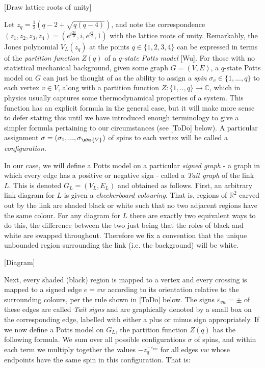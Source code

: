 [Draw lattice roots of unity]\newline

Let $z_q = \frac{1}{2}\left(q - 2 + \sqrt{q(q - 4)}\right)$, and note the correspondence $(z_1, z_2, z_3, z_4) = (e^{i\frac{2\pi}{3}}, i, e^{i\frac{\pi}{3}}, 1)$ with the lattice roots of unity. Remarkably, the Jones polynomial $V_L(z_q)$ at the points $q \in \{1, 2, 3, 4\}$ can be expressed in terms of the \textit{partition function} $Z(q)$ of a \textit{$q$-state Potts model} [Wu]. For those with no statistical mechanical background, given some graph $G = (V, E)$, a $q$-state Potts model on $G$ can just be thought of as the ability to assign a \textit{spin} $\sigma_v \in \{1, ..., q\}$ to each vertex $v \in V$, along with a partition function $Z: \{1, .., q\} \rightarrow \mathbb{C}$, which in physics usually captures some thermodynamical properties of a system. This function has an explicit formula in the general case, but it will make more sense to defer stating this until we have introduced enough terminology to give a simpler formula pertaining to our circumstances (see [ToDo] below). A particular assignment $\sigma = (\sigma_1, ..., \sigma_{\abs{V}})$ of spins to each vertex will be called a \textit{configuration}.\newline

In our case, we will define a Potts model on a particular \textit{signed graph} - a graph in which every edge has a positive or negative sign - called a \textit{Tait graph} of the link $L$. This is denoted $G_L = (V_L, E_L)$ and obtained as follows. First, an arbitrary link diagram for $L$ is given a \textit{checkerboard colouring}. That is, regions of $\mathbb{R}^2$ carved out by the link are shaded black or white such that no two adjacent regions have the same colour. For any diagram for $L$ there are exactly two equivalent ways to do this, the difference between the two just being that the roles of black and white are swapped throughout. Therefore we fix a convention that the unique unbounded region surrounding the link (i.e. the background) will be white.\newline

[Diagram]\newline

Next, every shaded (black) region is mapped to a vertex and every crossing is mapped to a signed edge $e = vw$ according to its orientation relative to the surrounding colours, per the rule shown in [ToDo] below. The signs $\varepsilon_{vw} = \pm$ of these edges are called \textit{Tait signs} and are graphically denoted by a small box on the corresponding edge, labelled with either a plus or minus sign appropriately. If we now define a Potts model on $G_L$, the partition function $Z(q)$ has the following formula. We sum over all possible configurations $\sigma$ of spins, and within each term we multiply together the values $-z_q^{-\varepsilon_{vw}}$ for all edges $vw$ whose endpoints have the same spin in this configuration. That is:

